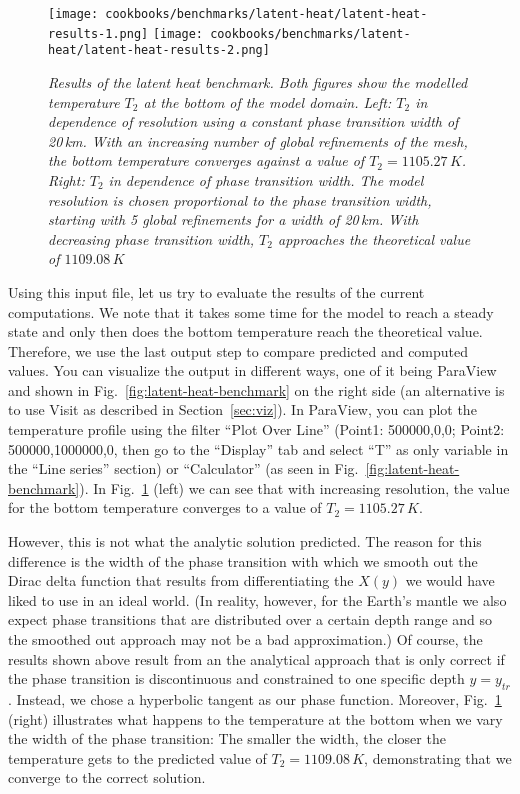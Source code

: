 \documentclass{article}
\begin{document}
\begin{figure}
  \begin{center}
    \texttt{[image: cookbooks/benchmarks/latent-heat/latent-heat-results-1.png]}
    \hfill
    \texttt{[image: cookbooks/benchmarks/latent-heat/latent-heat-results-2.png]}
  \end{center}
  \caption{\it Results of the latent heat benchmark. Both figures show the modelled temperature $T_2$ at the bottom of the model domain.
      Left: $T_2$ in dependence of resolution using a constant phase transition width of 20\,km. With an increasing number of global refinements of the mesh, the bottom temperature converges against a value of $T_2 = 1105.27 \, \si{K}$.
      Right: $T_2$ in dependence of phase transition width. The model resolution is chosen proportional to the phase transition width, starting with 5 global refinements for a width of 20\,km. With decreasing phase transition width, $T_2$ approaches the theoretical value of $1109.08 \, \si{K}$}
  \label{fig:latent-heat-benchmark-results}
\end{figure}

Using this input file, let us try to evaluate the results of the current
computations. We note that it takes some time for the model to reach a steady
state and only then does the bottom temperature reach the theoretical value.
Therefore, we use the last output step to compare predicted and computed values.
You can visualize the output in different ways, one of it being ParaView and shown in
Fig.~\ref{fig:latent-heat-benchmark} on the right side (an alternative is to use Visit as
described in Section~\ref{sec:viz}). In ParaView, you can plot the temperature profile
using the filter ``Plot Over Line'' (Point1: 500000,0,0; Point2:
500000,1000000,0, then go to the ``Display'' tab and select ``T'' as only
variable in the ``Line series'' section) or ``Calculator'' (as seen in
Fig.~\ref{fig:latent-heat-benchmark}). In
Fig.~\ref{fig:latent-heat-benchmark-results} (left) we can see that with
increasing resolution, the value for the bottom temperature converges to a value
of $T_2 = 1105.27 \, \si{K}$. 

However, this is not what the analytic solution
predicted. The reason for this difference is the width of the phase transition
with which we smooth out the Dirac delta function that results from
differentiating the $X(y)$ we would have liked to use in an ideal world.
(In reality, however, for the Earth's mantle we also expect phase transitions
that are distributed over a certain depth range and so the smoothed out
approach may not be a bad approximation.)
Of course, the results shown above result from an the analytical approach that
is only correct if the phase transition is discontinuous and constrained to one
specific depth $y=y_{tr}$. Instead, we chose a hyperbolic
tangent as our phase function. Moreover,
Fig.~\ref{fig:latent-heat-benchmark-results} (right) illustrates what happens to
the temperature at the bottom when we vary the width of the phase transition:
The smaller the width, the closer the temperature gets to the predicted value of
$T_2 = 1109.08 \, \si{K}$, demonstrating that we converge to the correct
solution.
\end{document}

